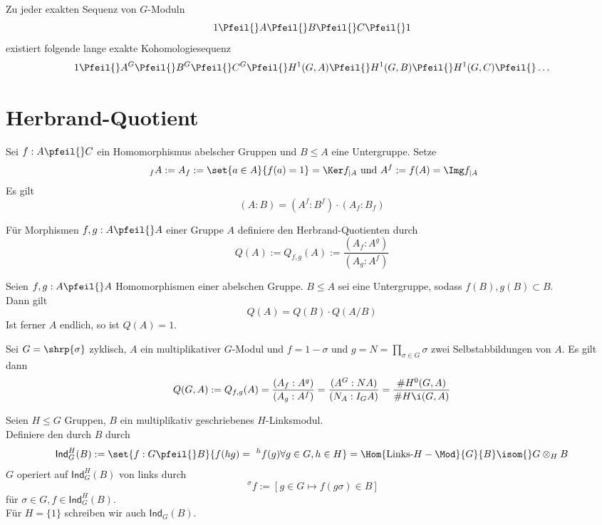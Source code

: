 Zu jeder exakten Sequenz von $G$-Moduln
\[ 1 \Pfeil{} A \Pfeil{} B \Pfeil{} C \Pfeil{} 1\]
existiert folgende lange exakte Kohomologiesequenz
\begin{align*}
1 \Pfeil{} A^G \Pfeil{} B^G \Pfeil{} C^G \Pfeil{} H^1(G,A) \Pfeil{} H^1(G,B) \Pfeil{} H^1(G,C) \Pfeil{} \ldots
\end{align*}

\section{Herbrand-Quotient}
\Lem{}
Sei $f : A \pfeil{} C$ ein Homomorphismus abelscher Gruppen und $B \leq A$ eine Untergruppe. Setze
\[ \ _fA := A_f := \set{a\in A}{f(a) = 1} = \Ker f_{|A} \text{ und } A^f := f(A) = \Img f_{|A} \]
Es gilt
\[ (A:B) = (A^f:B^f) \cdot (A_f : B_f) \]

Für Morphismen $f, g : A\pfeil{} A $ einer Gruppe $A$ definiere den Herbrand-Quotienten durch
\[ Q(A) := Q_{f,g}(A) := \frac{(A_f : A^g)}{(A_g : A^f)} \]

\Lem{}
Seien $f, g : A\pfeil{} A $ Homomorphismen einer abelschen Gruppe. $B \leq A$ sei eine Untergruppe, sodass $f(B),g(B) \subset B$.\\
Dann gilt
\[ Q(A) = Q(B) \cdot Q(A/B) \]
Ist ferner $A$ endlich, so ist $Q(A) = 1$.

\Bem{}
Sei $G = \shrp{\sigma}$ zyklisch, $A$ ein multiplikativer $G$-Modul und $f = 1 - \sigma$ und $g =N = \prod_{\sigma \in G}\sigma$ zwei Selbstabbildungen von $A$. Es gilt dann
\[ Q(G,A):=Q_{f,g}(A) = \frac{(A_f : A^g)}{(A_g : A^f)} = \frac{(A^G : NA)}{(N_A : I_GA)} = \frac{\# H^0(G,A)}{\# H\i(G,A)} \]

Seien $H\leq G$ Gruppen, $B$ ein multiplikativ geschriebenes $H$-Linksmodul.\\
Definiere den durch $B$  durch
\[ \textsf{Ind}_G^H(B) := \set{f : G \pfeil{} B}{f(hg) = \ ^hf(g) \forall g \in G, h\in H }  = \Hom{\text{Links-}H-\Mod}{G}{B} \isom{} G \otimes_{H} B \]
$G$ operiert auf $\textsf{Ind}^H_G(B)$ von links durch
\[ \ ^\sigma f := [g \in G \mapsto f(g\sigma) \in B ] \]
für $\sigma \in G, f \in \textsf{Ind}^H_G(B)$.\\
Für $H = \{1\}$ schreiben wir auch $\textsf{Ind}_G(B)$.

